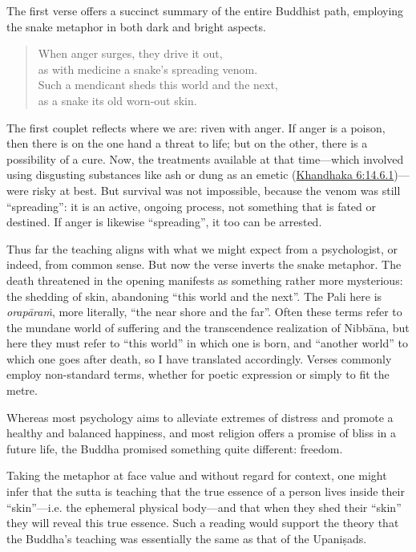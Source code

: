 \documentclass[12pt,openany]{book}%
\begin{document}
The first verse offers a succinct summary of the entire Buddhist path, employing the snake metaphor in both dark and bright aspects.

\begin{verse}%
When anger surges, they drive it out, \\
as with medicine a snake’s spreading venom. \\
Such a mendicant sheds this world and the next, \\
as a snake its old worn-out skin.

%
\end{verse}

The first couplet reflects where we are: riven with anger. If anger is a poison, then there is on the one hand a threat to life; but on the other, there is a possibility of a cure. Now, the treatments available at that time—which involved using disgusting substances like ash or dung as an emetic (\href{https://suttacentral.net/pli{-}tv{-}kd6/en/brahmali\#14.6.1}{Khandhaka 6:14.6.1})—were risky at best. But survival was not impossible, because the venom was still “spreading”: it is an active, ongoing process, not something that is fated or destined. If anger is likewise “spreading”, it too can be arrested.

Thus far the teaching aligns with what we might expect from a psychologist, or indeed, from common sense. But now the verse inverts the snake metaphor. The death threatened in the opening manifests as something rather more mysterious: the shedding of skin, abandoning “this world and the next”. The Pali here is \textit{\textsanskrit{orapāraṁ}}, more literally, “the near shore and the far”. Often these terms refer to the mundane world of suffering and the transcendence realization of \textsanskrit{Nibbāna}, but here they must refer to “this world” in which one is born, and “another world” to which one goes after death, so I have translated accordingly. Verses commonly employ non-standard terms, whether for poetic expression or simply to fit the metre.

Whereas most psychology aims to alleviate extremes of distress and promote a healthy and balanced happiness, and most religion offers a promise of bliss in a future life, the Buddha promised something quite different: freedom.

Taking the metaphor at face value and without regard for context, one might infer that the sutta is teaching that the true essence of a person lives inside their “skin”—i.e. the ephemeral physical body—and that when they shed their “skin” they will reveal this true essence. Such a reading would support the theory that the Buddha’s teaching was essentially the same as that of the \textsanskrit{Upaniṣads}.
\end{document}
